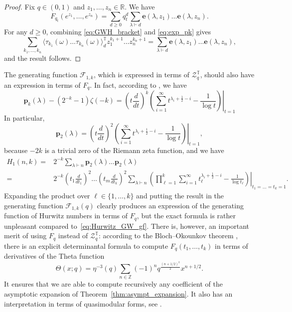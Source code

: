 \documentclass[11pt,a4paper,reqno]{article}
\theoremstyle{definition}
\theoremstyle{remark}
\newcommand\Z{{\mathbb Z}}
\newcommand\R{\mathbb{R}}
\newcommand\Tbb{\mathbb{T}}
\begin{document}
\begin{proof}
Fix $q\in(0,1)$ and $z_1,\ldots,z_n\in\R$. We have
\[
F_{q_t}(e^{z_1},\ldots,e^{z_n})=\sum_{d\geq 0}q_t^d\sum_{\lambda\vdash d}\mathbf{e}(\lambda,z_1)\ldots\mathbf{e}(\lambda,z_n).
\]
For any $d\geq 0$, combining \eqref{eq:GWH_bracket} and \eqref{eq:exp_pk} gives
\[
\sum_{k_1,\ldots,k_n}\langle\tau_{k_1}(\omega)\ldots\tau_{k_n}(\omega)\rangle_d^\Tbb z_1^{k_1+1}\ldots z_n^{k_n+1}=\sum_{\lambda\vdash d}\mathbf{e}(\lambda,z_1)\ldots\mathbf{e}(\lambda,z_n),
\]
and the result follows.
\end{proof}
The generating function $\mathcal{F}_{1,k}$, which is expressed in terms of $\mathcal{Z}_q^\Tbb$, should also have an expression in terms of $F_q$. In fact, according to \cite[0.18]{BO}, we have
\begin{equation}
\mathbf{p}_k(\lambda)-(2^{-k}-1)\zeta(-k)=\left(t\frac{d}{dt}\right)^k\left.\left(\sum_{i=1}^\infty t^{\lambda_i+\frac12-i}-\frac{1}{\log t}\right)\right\vert_{t=1}
\end{equation}
In particular,
\[
\mathbf{p}_2(\lambda)=\left(t\frac{d}{dt}\right)^2\left.\left(\sum_{i=1}^\infty t^{\lambda_i+\frac12-i}-\frac{1}{\log t}\right)\right\vert_{t=1},
\]
because $-2k$ is a trivial zero of the Riemann zeta function, and we have
\begin{align*}
H_1(n,k)= & 2^{-k}\sum_{\lambda\vdash n}\mathbf{p}_{2}(\lambda)\ldots \mathbf{p}_{2}(\lambda)\\
= & 2^{-k}\left(t_1\frac{d}{dt_1}\right)^2\ldots\left(t_m\frac{d}{dt_k}\right)^2\left.\sum_{\lambda\vdash n}\left(\prod_{\ell=1}^k\sum_{i=1}^\infty t_\ell^{\lambda_i+\frac12-i}-\frac{1}{\log t_\ell}\right)\right\vert_{t_1=\ldots=t_k=1}.
\end{align*}
Expanding the product over $\ell\in\{1,\ldots,k\}$ and putting the result in the generating function $\mathcal{F}_{1,k}(q)$ clearly produces an expression of the generating function of Hurwitz numbers in terms of $F_q$, but the exact formula is rather unpleasant compared to~\eqref{eq:Hurwitz_GW_gf}. There is, however, an important merit of using $F_q$ instead of $\mathcal{Z}_q^\Tbb$: according to the Bloch--Okounkov theorem \cite[Theorem 6.1]{BO}, there is an explicit determinantal formula to compute $F_q(t_1,\ldots,t_k)$ in terms of derivatives of the Theta function
\[
\Theta(x;q)=\eta^{-3}(q)\sum_{n\in\Z}(-1)^nq^{\frac{(n+1/2)^2}{2}}x^{n+1/2}.
\]
It ensures that we are able to compute recursively any coefficient of the asymptotic expansion of Theorem~\ref{thm:asympt_expansion}. It also has an interpretation in terms of quasimodular forms, see \cite{Dij,OP2}.





\end{document}
